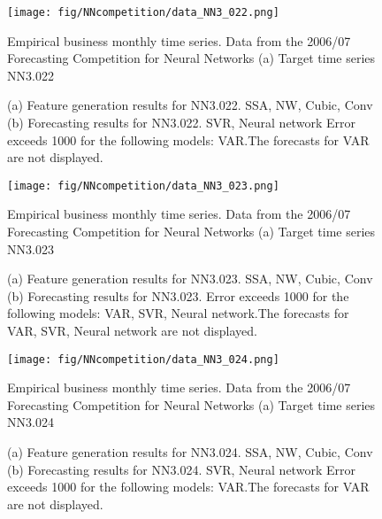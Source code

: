 \documentclass[12pt]{article}
\begin{document}
\begin{figure}
\centering
\texttt{[image: fig/NNcompetition/data\_NN3\_022.png]}
\caption{Empirical business monthly time series. Data from the 2006/07 Forecasting Competition for Neural Networks	(a) Target time series	NN3.022	}
\end{figure}


\begin{figure}
\centering
{}
\caption{(a)	Feature generation results for	NN3.022.	SSA, NW, Cubic, Conv	(b)	Forecasting results for	NN3.022.	SVR, Neural network	Error exceeds 1000 for the following models: VAR.The forecasts for VAR are not displayed.	}
\end{figure}


\begin{figure}
\centering
\texttt{[image: fig/NNcompetition/data\_NN3\_023.png]}
\caption{Empirical business monthly time series. Data from the 2006/07 Forecasting Competition for Neural Networks	(a) Target time series	NN3.023	}
\end{figure}


\begin{figure}
\centering
{}
\caption{(a)	Feature generation results for	NN3.023.	SSA, NW, Cubic, Conv	(b)	Forecasting results for	NN3.023.		Error exceeds 1000 for the following models: VAR, SVR, Neural network.The forecasts for VAR, SVR, Neural network are not displayed.	}
\end{figure}


\begin{figure}
\centering
\texttt{[image: fig/NNcompetition/data\_NN3\_024.png]}
\caption{Empirical business monthly time series. Data from the 2006/07 Forecasting Competition for Neural Networks	(a) Target time series	NN3.024	}
\end{figure}


\begin{figure}
\centering
{}
\caption{(a)	Feature generation results for	NN3.024.	SSA, NW, Cubic, Conv	(b)	Forecasting results for	NN3.024.	SVR, Neural network	Error exceeds 1000 for the following models: VAR.The forecasts for VAR are not displayed.	}
\end{figure}
\end{document}
